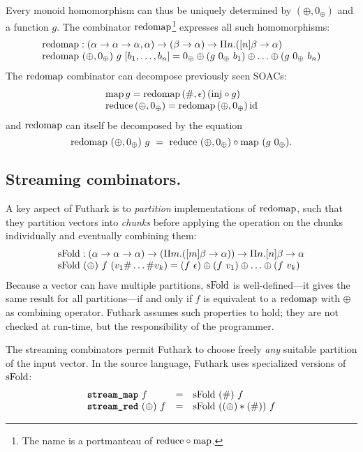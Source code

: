 Every monoid homomorphism can thus be uniquely determined by
$(\oplus,0_{\oplus})$ and a function $g$.  The combinator
$\mathrm{redomap}$\footnote{The name is a portmanteau of
  $\mathrm{reduce} \circ \mathrm{map}$.} expresses all such homomorphisms:
\[ \begin{array}{l}
\mathrm{redomap} : (\alpha \to \alpha \to \alpha, \alpha) \to (\beta \to \alpha) \to \Pi n. ([n]\beta \to \alpha) \\
\mathrm{redomap}~(\oplus, 0_{\oplus})~g~[b_1, \ldots, b_n] = 0_{\oplus} \oplus (g~0_{\oplus}~b_1) \oplus \ldots \oplus (g~0_{\oplus}~b_n)
\end{array} \]
The $\mathrm{redomap}$ combinator can decompose previously seen SOACs:
\[ \begin{array}{l}
\mathrm{map} \, g = \mathrm{redomap}\, (\#, \epsilon)\, (\mathrm{inj} \circ g) \\
\mathrm{reduce}\, (\oplus, 0_{\oplus}) = \mathrm{redomap}\, (\oplus, 0_{\oplus})\, \mathrm{id}
\end{array} \]
and $\mathrm{redomap}$ can itself be decomposed by the equation
\[
  \mathrm{redomap} ~ (\oplus,0_{\oplus}) ~ g ~ = ~ \mathrm{reduce} ~ (\oplus,0_{\oplus}) \circ \mathrm{map} ~ (g~0_{\oplus}).
\]

\subsection{Streaming combinators.}

A key aspect of Futhark is to \emph{partition} implementations of
$\mathrm{redomap}$, such that they partition vectors into \emph{chunks}
before applying the operation on the chunks individually and
eventually combining them:
\[ \begin{array}{l}
\mathrm{sFold} : (\alpha \to \alpha \to \alpha) \to (\Pi m. ([m]\beta \to \alpha)) \to \Pi n. [n]\beta \to \alpha \\
\mathrm{sFold}~(\oplus)~f~(v_1 \# \ldots \# v_k) = (f~\epsilon) \oplus (f~v_1) \oplus \ldots \oplus (f~v_k) \\
\end{array} \]
%
Because a vector can have multiple partitions, $\mathrm{sFold}$ is
well-defined---it gives the same result for all partitions---if and
only if $f$ is equivalent to a $\mathrm{redomap}$ with $\oplus$ as combining
operator.  Futhark assumes such properties to hold; they are not
checked at run-time, but the responsibility of the programmer.

The streaming combinators permit Futhark to choose freely \emph{any}
suitable partition of the input vector.  In the source language, Futhark uses specialized
versions of $\mathrm{sFold}$:
\[
  \begin{array}{lcl}
    \mbox{\texttt{\bfseries{stream\_map}}}~f & = &  \mathrm{sFold}~(\#)~f \\
    \mbox{\texttt{\bfseries{stream\_red}}}~(\oplus)~f & = & \mathrm{sFold}~((\oplus) * (\#))~f
  \end{array}
\]


